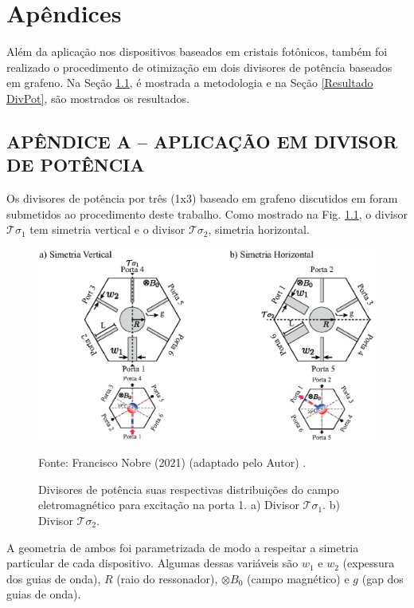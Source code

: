 \chapter{Apêndices}      \label{Apendice}

Além da aplicação nos dispositivos baseados em cristais fotônicos, também foi realizado o procedimento de otimização em dois divisores de potência baseados em grafeno. Na Seção \ref{Aplicacao Divisor}, é mostrada a metodologia e na Seção \ref{Resultado DivPot}, são mostrados os resultados.

\section{APÊNDICE A -- APLICAÇÃO EM DIVISOR DE POTÊNCIA}      \label{Aplicacao Divisor}

Os divisores de potência por três (1x3) baseado em grafeno discutidos em \cite{Dmitriev2021Nonreciprocal} foram submetidos ao procedimento deste trabalho. Como mostrado na Fig. \ref{fig: GrapheneDividers}, o divisor $\mathcal{T}\sigma_{1}$ tem simetria vertical e o divisor $\mathcal{T}\sigma_{2}$, simetria horizontal.

\begin{figure}[H]
    \centering
    \includegraphics{04-Figuras/GrapheneDividers.eps}
    \caption{Divisores de potência suas respectivas distribuições do campo eletromagnético para excitação na porta 1. a) Divisor $\mathcal{T}\sigma_{1}$. b) Divisor $\mathcal{T}\sigma_{2}$.} \par
    Fonte: Francisco Nobre (2021) (adaptado pelo Autor) \cite{Nobre2021Graphene}.
    \label{fig: GrapheneDividers}
\end{figure}

A geometria de ambos foi parametrizada de modo a respeitar a simetria particular de cada dispositivo. Algumas dessas variáveis são $w_{1}$ e $w_{2}$ (expessura dos guias de onda), $R$ (raio do ressonador), $\otimes B_{0}$ (campo magnético) e $g$ (gap dos guias de onda).


